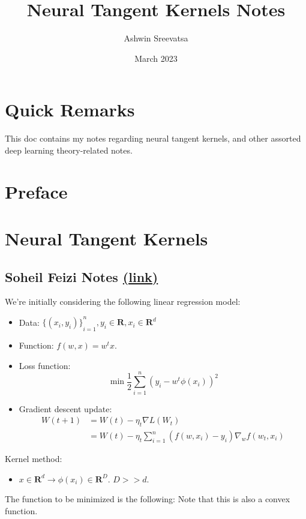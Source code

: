 \documentclass[answers,12pt]{exam}
\title{Neural Tangent Kernels Notes}
\author{Ashwin Sreevatsa}
\date{March 2023}
\begin{document}
\maketitle
\setcounter{section}{-1}

\section*{Quick Remarks}
This doc contains my notes regarding neural tangent kernels, and other assorted deep learning theory-related notes.

\section{Preface}

\section{Neural Tangent Kernels}

\subsection{Soheil Feizi Notes \href{https://www.youtube.com/watch?v=DObobAnELkU}{(link)}}

We're initially considering the following linear regression model: 
\begin{itemize}
    \item Data: ${\{(x_i,y_i)\}}_{i=1}^n, y_i \in \mathbf{R}, x_i \in \mathbf{R}^d$
    \item Function: $f(w,x) = w^t x$. 
    \item Loss function: \[\min \frac{1}{2} \sum_{i=1}^n { (y_i - w^t \phi(x_i))}^2\]
    \item Gradient descent update:
    \[ \begin{aligned}
        W(t+1) &= W(t) - \eta_t \nabla L(W_t) \\
        &= W(t) - \eta_t \sum_{i=1}^{n} (f(w,x_i)-y_i) \nabla_w f(w_t, x_i)
        \end{aligned}
    \]
\end{itemize}

Kernel method:

\begin{itemize}
    \item $x \in \mathbf{R}^d \to \phi(x_i) \in \mathbf{R}^D$.
    $D >> d$.
\end{itemize}
The function to be minimized is the following:
Note that this is also a convex function.
\end{document}
